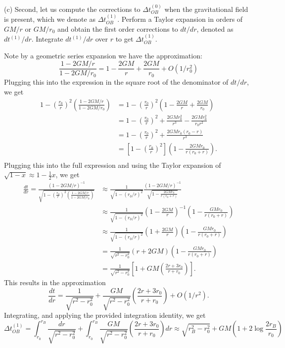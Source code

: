 \documentclass{../../templates/lkx_pset}
\begin{document}
\begin{parts}
  \begin{part}{(c)}
    Second, let us compute the corrections to $\Delta t_{OB}^{(0)}$ when the gravitational field is present, which we denote as $\Delta t_{OB}^{(1)}$. Perform a Taylor expansion in orders of $GM/r$ or $GM/r_0$ and obtain the first order corrections to $dt/dr$, denoted as $dt^{(1)}/dr$. 
    Integrate $dt^{(1)}/dr$ over $r$ to get $\Delta t^{(1)}_{OB}$.
  \end{part}

  Note by a geometric series expansion we have the approximation:
  \[
    \frac{1-2GM/r}{1-2GM/r_0} = 1-\frac{2GM}{r}+\frac{2GM}{r_0} + O(1/r_0^2)
  \]
  Plugging this into the expression in the square root of the denominator of $dt/dr$, we get
  \[
    \begin{aligned}
      1-\left(\frac{r_0}{r}\right)^2\left(\frac{1-2GM/r}{1-2GM/r_0}\right) 
      &= 1-\left(\frac{r_0}{r}\right)^2\left(1-\frac{2GM}{r} + \frac{2GM}{r_0}\right) \\
      &= 1-\left(\frac{r_0}{r}\right)^2  + \frac{2GM r_0^2}{r^3} - \frac{2GMr_0^2}{r_0 r^2}\\
      &= 1-\left(\frac{r_0}{r}\right)^2 + \frac{2GMr_0(r_0 - r)}{r^3}\\
      &= \left[1-\left(\frac{r_0}{r}\right)^2\right]\left(1-\frac{2GMr_0}{r(r_0 + r)}\right).\\
    \end{aligned}
  \]
  Plugging this into the full expression and using the Taylor expansion of $\sqrt{1-x}\approx 1-\frac{1}{2}x$, we get
  \[
    \begin{aligned}
    \frac{dt}{dr} = \frac{(1-2GM/r)^{-1}}{\sqrt{1-\left(\frac{r_0}{r}\right)^2\left(\frac{1-2GM/r}{1-2GM/r_0}\right)}} 
    &\approx \frac{1}{\sqrt{1-(r_0/r)^2}}\frac{(1-2GM/r)^{-1}}{\sqrt{1-\frac{2GMr_0}{r(r_0+r)}}}\\
    &\approx \frac{1}{\sqrt{1-(r_0/r)^2}}\left(1-\frac{2GM}{r}\right)^{-1}\left(1 - \frac{GMr_0}{r(r_0+r)}\right)\\
    &\approx \frac{1}{\sqrt{1-(r_0/r)^2}}\left(1+\frac{2GM}{r}\right)\left(1 - \frac{GMr_0}{r(r_0+r)}\right)\\ 
    &=\frac{1}{\sqrt{r^2-r_0^2}}(r+2GM)\left(1 - \frac{GMr_0}{r(r_0+r)}\right)\\ 
    &=\frac{1}{\sqrt{r^2-r_0^2}}\left[ 1 + GM\left(\frac{2r+3r_0}{r+r_0}\right)\right].
    \end{aligned}
  \]
  This results in the approximation
  \[
    \frac{dt}{dr} = \frac{1}{\sqrt{r^2-r_0^2}} + \frac{GM}{\sqrt{r^2-r_0^2}}\left(\frac{2r+3r_0}{r+r_0}\right)+O(1/r^2).
  \]
  Integrating, and applying the provided integration identity, we get
  \[
    \Delta t^{(1)}_{OB} = \int_{r_0}^{r_B} \frac{dr}{\sqrt{r^2-r_0^2}} + \int_{r_0}^{r_B} \frac{GM}{\sqrt{r^2-r_0^2}}\left(\frac{2r + 3r_0}{r+r_0}\right)dr \approx \sqrt{r_B^2-r_0^2} + GM\left(1+2\log \frac{2r_B}{r_0}\right)
  \]


\end{parts}
\end{document}
